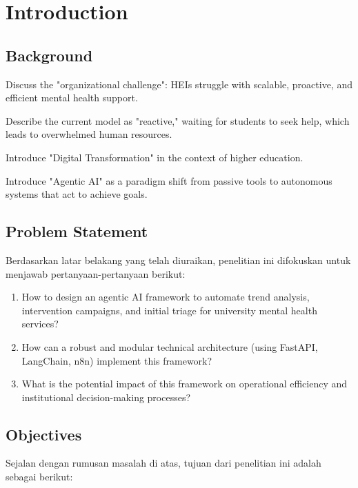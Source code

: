 \chapter{Introduction}

\section{Background}
\label{sec:background}


Discuss the "organizational challenge": HEIs struggle with scalable, proactive, and efficient mental health support.

Describe the current model as "reactive," waiting for students to seek help, which leads to overwhelmed human resources.

Introduce "Digital Transformation" in the context of higher education.

Introduce "Agentic AI" as a paradigm shift from passive tools to autonomous systems that act to achieve goals.


\section{Problem Statement}
\label{sec:problem_statement}

\noindent Berdasarkan latar belakang yang telah diuraikan, penelitian ini difokuskan untuk menjawab pertanyaan-pertanyaan berikut:

\begin{enumerate}
    \item How to design an agentic AI framework to automate trend analysis, intervention campaigns, and initial triage for university mental health services?
    \item How can a robust and modular technical architecture (using FastAPI, LangChain, n8n) implement this framework?
    \item What is the potential impact of this framework on operational efficiency and institutional decision-making processes?
\end{enumerate}


\section{Objectives}
\label{sec:objectives}

\noindent Sejalan dengan rumusan masalah di atas, tujuan dari penelitian ini adalah sebagai berikut:

